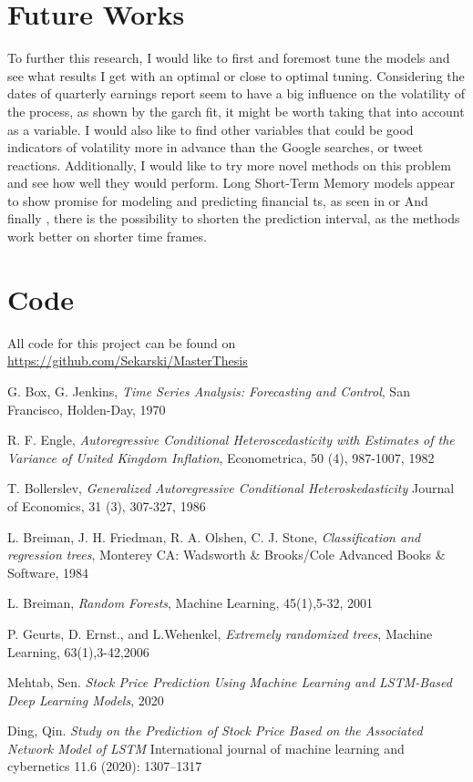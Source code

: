 \documentclass[10pt]{report}
\begin{document}
\chapter{Future Works}
\label{chap:future}
To further this research, I would like to first and foremost tune the models and see what results I get with an optimal or close to optimal tuning.
Considering the dates of quarterly earnings report seem to have a big influence on the volatility of the process, as shown by the \acrlong{garch} fit, it might be worth taking that into account as a variable. I would also like to find other variables that could be good indicators of volatility more in advance than the Google searches, or tweet reactions.
Additionally, I would like to try more novel methods on this problem and see how well they would perform. Long Short-Term Memory models appear to show promise for modeling and predicting financial \acrlong{ts}, as seen in \cite{LSTMpaper1} or \cite{LSTMpaper2}
And finally , there is the possibility to shorten the prediction interval, as the methods work better on shorter time frames.

\chapter*{Code}
All code for this project can be found on \url{https://github.com/Sekarski/MasterThesis}

\begin{thebibliography}{9}

G. Box, G. Jenkins, \textit{Time Series Analysis: Forecasting and Control}, San Francisco, Holden-Day, 1970

R. F. Engle, \textit{Autoregressive Conditional Heteroscedasticity with Estimates of the Variance of United Kingdom Inflation}, Econometrica, 50 (4), 987-1007, 1982

T. Bollerslev, \textit{Generalized Autoregressive Conditional Heteroskedasticity} Journal of Economics, 31 (3), 307-327, 1986

L. Breiman, J. H. Friedman, R. A. Olshen, C. J. Stone, \textit{Classification and regression trees}, Monterey CA: Wadsworth \& Brooks/Cole Advanced Books \& Software, 1984

L. Breiman, \textit{Random Forests}, Machine Learning, 45(1),5-32, 2001

P. Geurts, D. Ernst., and L.Wehenkel, \textit{Extremely randomized trees}, Machine Learning, 63(1),3-42,2006

Mehtab, Sen. \textit{Stock Price Prediction Using Machine Learning and LSTM-Based Deep Learning Models}, 2020

Ding, Qin. \textit{Study on the Prediction of Stock Price Based on the Associated Network Model of LSTM} International journal of machine learning and cybernetics 11.6 (2020): 1307–1317

\end{thebibliography}


\printglossary[type=\acronymtype]
\printglossary
\end{document}
